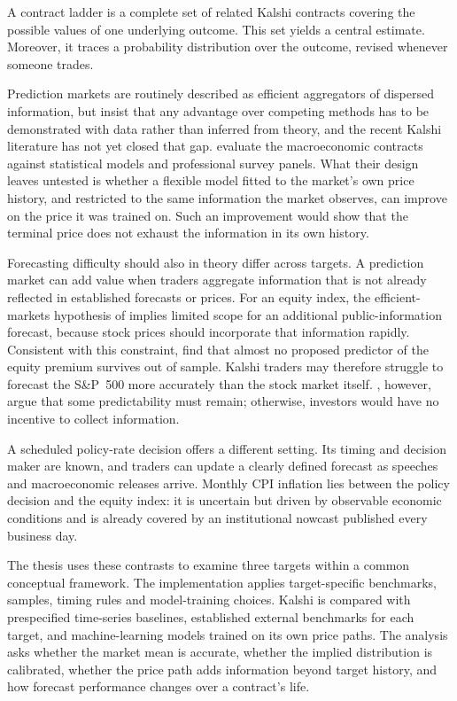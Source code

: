 \documentclass[12pt,a4paper]{report}
\begin{document}
A contract ladder is a complete set of related Kalshi contracts covering the
possible values of one underlying outcome. This set yields a central
estimate. Moreover, it traces a probability distribution over the outcome, revised
whenever someone trades.

Prediction markets are
routinely described as efficient aggregators of dispersed information, but
\textcite{snowberg2013} insist that any advantage over competing methods has to be
demonstrated with data rather than inferred from theory, and the recent Kalshi
literature has not yet closed that gap. \textcite{diercks2026} evaluate the macroeconomic contracts against
statistical models and professional survey panels. What their design leaves
untested is whether a flexible model fitted to the market's own price history,
and restricted to the same information the market observes, can improve on the
price it was trained on. Such an improvement would show that the terminal price
does not exhaust the information in its own history.

Forecasting difficulty should also in theory differ across targets. A prediction market
can add value when traders aggregate information that is not already reflected
in established forecasts or prices. For an equity index, the efficient-markets
hypothesis of \textcite{fama1970} implies limited scope for an additional
public-information forecast, because stock prices should incorporate that
information rapidly. Consistent with this constraint, \textcite{welch2008} find
that almost no proposed predictor of the equity premium survives out of sample.
Kalshi traders may therefore struggle to forecast the S\&P~500 more accurately
than the stock market itself. \textcite{grossman1980}, however, argue that some
predictability must remain; otherwise, investors would have no incentive to
collect information.

A scheduled policy-rate decision offers a different setting. Its timing and
decision maker are known, and traders can update a clearly defined forecast as
speeches and macroeconomic releases arrive. Monthly CPI inflation lies between
the policy decision and the equity index: it is uncertain but driven by
observable economic conditions and is already covered by an institutional
nowcast published every business day.

The thesis uses these contrasts to examine three targets within a common
conceptual framework. The implementation applies target-specific benchmarks,
samples, timing rules and model-training choices. Kalshi is compared with
prespecified time-series baselines, established external benchmarks for each
target, and machine-learning models trained on its own price paths. The analysis
asks whether the market mean is accurate, whether the implied distribution is
calibrated, whether the price path adds information beyond target history, and
how forecast performance changes over a contract's life.
\end{document}
